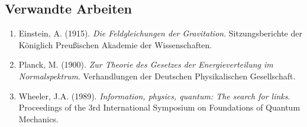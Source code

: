 \documentclass[12pt,a4paper]{article}
\begin{document}
	\subsection{Verwandte Arbeiten}
	
	\begin{enumerate}
		\item Einstein, A. (1915). \textit{Die Feldgleichungen der Gravitation}. Sitzungsberichte der Königlich Preußischen Akademie der Wissenschaften.
		\item Planck, M. (1900). \textit{Zur Theorie des Gesetzes der Energieverteilung im Normalspektrum}. Verhandlungen der Deutschen Physikalischen Gesellschaft.
		\item Wheeler, J.A. (1989). \textit{Information, physics, quantum: The search for links}. Proceedings of the 3rd International Symposium on Foundations of Quantum Mechanics.
	\end{enumerate}
	
\end{document}
